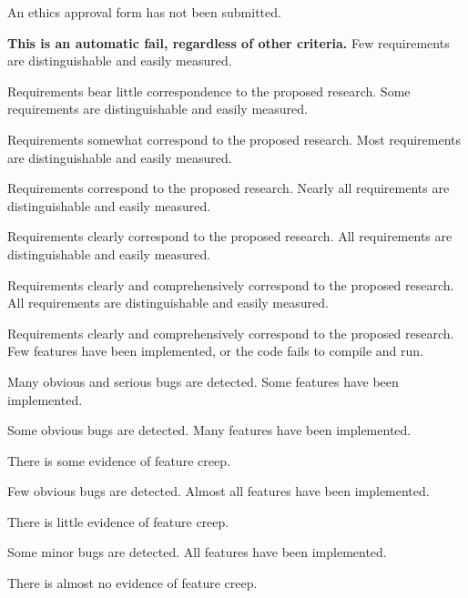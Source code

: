 \documentclass{../fal_assignment}
\begin{document}
\rubricyearthree
{}
\begin{markingrubric}
		\grade\fail An ethics approval form has not been submitted.
			\par \textbf{This is an automatic fail, regardless of other criteria.}
        \grade \fail Few requirements are distinguishable and easily measured.
            \par Requirements bear little correspondence to the proposed research.
        \grade Some requirements are distinguishable and easily measured.
            \par Requirements somewhat correspond to the proposed research.
        \grade Most requirements are distinguishable and easily measured.
            \par Requirements correspond to the proposed research.
        \grade Nearly all requirements are distinguishable and easily measured.
            \par Requirements clearly correspond to the proposed research.
        \grade All requirements are distinguishable and easily measured.
            \par Requirements clearly and comprehensively correspond to the proposed research.
        \grade All requirements are distinguishable and easily measured.
            \par Requirements clearly and comprehensively correspond to the proposed research.
%
        \grade \fail Few features have been implemented, or the code fails to compile and run.
            \par Many obvious and serious bugs are detected.
        \grade Some features have been implemented.
            \par Some obvious bugs are detected.
        \grade Many features have been implemented.
            \par There is some evidence of feature creep.
            \par Few obvious bugs  are detected.
        \grade Almost all features have been implemented.
            \par There is little evidence of feature creep.
            \par Some minor bugs  are detected.
        \grade All features have been implemented.
            \par There is almost no evidence of feature creep.

\end{markingrubric}
\end{document}
